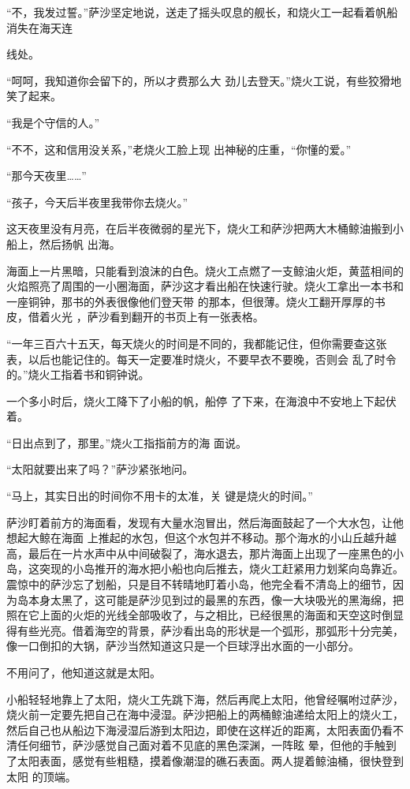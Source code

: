 \documentclass{article}
\begin{document}
“不，我发过誓。”萨沙坚定地说，送走了摇头叹息的舰长，和烧火工一起看着帆船消失在海天连

\newpage
线处。 

“呵呵，我知道你会留下的，所以才费那么大
劲儿去登天。”烧火工说，有些狡猾地笑了起来。 


“我是个守信的人。” 

“不不，这和信用没关系，”老烧火工脸上现
出神秘的庄重，“你懂的爱。” 


“那今天夜里……” 


“孩子，今天后半夜里我带你去烧火。” 

这天夜里没有月亮，在后半夜微弱的星光下，烧火工和萨沙把两大木桶鲸油搬到小船上，然后扬帆
出海。 

海面上一片黑暗，只能看到浪沫的白色。烧火工点燃了一支鲸油火炬，黄蓝相间的火焰照亮了周围的一小圈海面，萨沙这才看出船在快速行驶。烧火工拿出一本书和一座铜钟，那书的外表很像他们登天带
\newpage
的那本，但很薄。烧火工翻开厚厚的书皮，借着火光
，萨沙看到翻开的书页上有一张表格。 

“一年三百六十五天，每天烧火的时间是不同的，我都能记住，但你需要查这张表，以后也能记住的。每天一定要准时烧火，不要早衣不要晚，否则会
乱了时令的。”烧火工指着书和铜钟说。 

一个多小时后，烧火工降下了小船的帆，船停
了下来，在海浪中不安地上下起伏着。 

“日出点到了，那里。”烧火工指指前方的海
面说。 


“太阳就要出来了吗？”萨沙紧张地问。 

“马上，其实日出的时间你不用卡的太准，关
键是烧火的时间。” 

萨沙盯着前方的海面看，发现有大量水泡冒出，然后海面鼓起了一个大水包，让他想起大鲸在海面
\newpage
上推起的水包，但这个水包并不移动。那个海水的小山丘越升越高，最后在一片水声中从中间破裂了，海水退去，那片海面上出现了一座黑色的小岛，这突现的小岛推开的海水把小船也向后推去，烧火工赶紧用力划桨向岛靠近。震惊中的萨沙忘了划船，只是目不转晴地盯着小岛，他完全看不清岛上的细节，因为岛本身太黑了，这可能是萨沙见到过的最黑的东西，像一大块吸光的黑海绵，把照在它上面的火炬的光线全部吸收了，与之相比，已经很黑的海面和天空这时倒显得有些光亮。借着海空的背景，萨沙看出岛的形状是一个弧形，那弧形十分完美，像一口倒扣的大锅，萨沙当然知道这只是一个巨球浮出水面的一小部分。


不用问了，他知道这就是太阳。 

小船轻轻地靠上了太阳，烧火工先跳下海，然后再爬上太阳，他曾经嘱咐过萨沙，烧火前一定要先把自己在海中浸湿。萨沙把船上的两桶鲸油递给太阳上的烧火工，然后自己也从船边下海浸湿后游到太阳边，即使在这样近的距离，太阳表面仍看不清任何细节，萨沙感觉自己面对着不见底的黑色深渊，一阵眩
\newpage
晕，但他的手触到了太阳表面，感觉有些粗糙，摸着像潮湿的礁石表面。两人提着鲸油桶，很快登到太阳
的顶端。 
\end{document}
